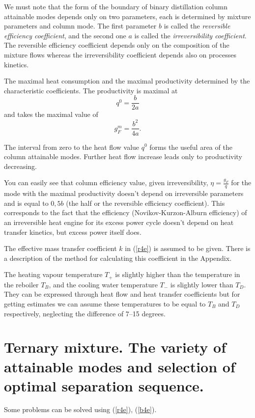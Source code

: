 \documentclass[12pt]{article}
\begin{document}
We must note that the form of the boundary of binary distillation column attainable modes depends only on two parameters, each is determined by mixture parameters and column mode. The first parameter $b$ is called the \textit{reversible efficiency coefficient}, and the second one $a$ is called the \textit{irreversibility coefficient}. The reversible efficiency coefficient depends only on the composition of the mixture flows whereas the irreversibility coefficient depends also on processes kinetics.

The maximal heat consumption and the maximal productivity determined by the characteristic coefficients. The productivity is maximal at
\begin{equation}\label{46n4}
q^0=\frac{b}{2a}
\end{equation}
and takes the maximal value of
\begin{equation}\label{46n5}
g_F^m=\frac{b^2}{4a}.
\end{equation}

The interval from zero to the heat flow value $q^0$ forms the useful area of the column attainable modes. Further heat flow increase leads only to productivity decreasing.

You can easily see that column efficiency value, given irreversibility, $\eta=\frac{g_F}{q}$ for the mode with the maximal productivity doesn't depend on irreversible parameters and is equal to $0,5b$ (the half or the reversible efficiency coefficient). This corresponds to the fact that the efficiency (Novikov-Kurzon-Alburn efficiency) of an irreversible heat engine for its excess power cycle doesn't depend on heat transfer kinetics, but excess power itself does. 

The effective mass transfer coefficient $k$ in (\ref{r4e}) is assumed to be given. There is a description of the method for calculating this coefficient in the Appendix.

The heating vapour temperature $T_+$ is slightly higher than the temperature in the reboiler $T_B$, and the cooling water temperature $T_-$ is slightly lower than $T_D$. They can be expressed through heat flow and heat transfer coefficients but for getting estimates we can assume these temperatures to be equal to $T_B$ and $T_D$ respectively, neglecting the difference of 7--15 degrees.

 
\section {Ternary mixture. The variety of attainable modes and selection of optimal separation sequence.}
Some problems can be solved using (\ref{r4e}), (\ref{b4e}).
\end{document}
